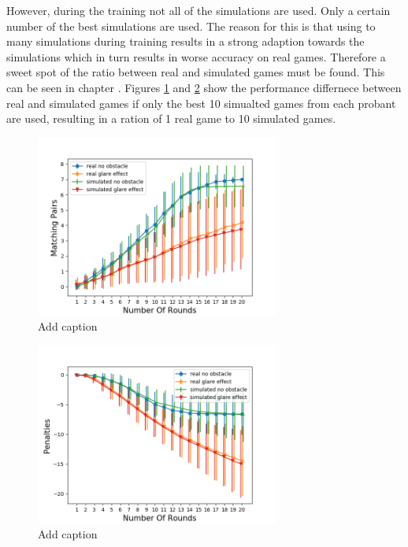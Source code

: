 However, during the training not all of the simulations are used. Only a certain number of the best simulations are used. The reason for this is that using to many simulations during training results in a strong adaption towards the simulations which in turn results in worse accuracy on real games. Therefore a sweet spot of the ratio between real and simulated games must be found. This can be seen in chapter . Figures \ref{fig:simOp101} and \ref{fig:simOp102} show the performance differnece between real and simulated games if only the best 10 simualted games from each probant are used, resulting in a ration of 1 real game to 10 simulated games.

\begin{minipage}{0.5\textwidth}
	\begin{figure}[H]
		\centering
		\includegraphics[width=8cm]{images/sd10x/Figure_3.png}
		\caption[Bild kurz]{Add caption}
		\label{fig:simOp101}
	\end{figure}
\end{minipage}
\begin{minipage}{0.5\textwidth}
	\begin{figure}[H]
		\centering
		\includegraphics[width=8cm]{images/sd10x/Figure_4.png}
		\caption[Bild kurz]{Add caption}
		\label{fig:simOp102}
	\end{figure}
\end{minipage} 

